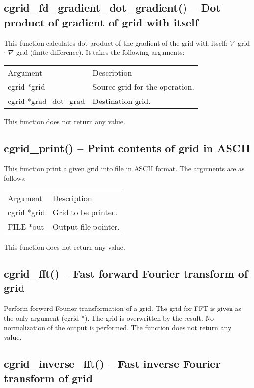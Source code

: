 \documentclass[12pt,letterpaper]{report}
\begin{document}
\subsection{cgrid\_fd\_gradient\_dot\_gradient() -- Dot product of gradient of grid with itself}

This function calculates dot product of the gradient of the grid with itself: $\nabla$ grid $\cdot$ $\nabla$ grid (finite difference). It takes the following arguments:
\begin{longtable}{p{} p{}}
Argument & Description\\
\cline{1-2}
cgrid *grid  & Source grid for the operation.\\
cgrid *grad\_dot\_grad & Destination grid.\\
\end{longtable}
\noindent
This function does not return any value.

\subsection{cgrid\_print() -- Print contents of grid in ASCII}

This function print a given grid into file in ASCII format. The arguments are as follows:
\begin{longtable}{p{} p{}}
Argument & Description\\
\cline{1-2}
cgrid *grid & Grid to be printed.\\
FILE *out & Output file pointer.\\
\end{longtable}
\noindent
This function does not return any value.

\subsection{cgrid\_fft() -- Fast forward Fourier transform of grid}

Perform forward Fourier transformation of a grid. The grid for FFT is given as the only argument (cgrid *). The grid is overwritten by the result. No normalization of the output is performed. The function does not return any value. 

\subsection{cgrid\_inverse\_fft() -- Fast inverse Fourier transform of grid}
\end{document}
